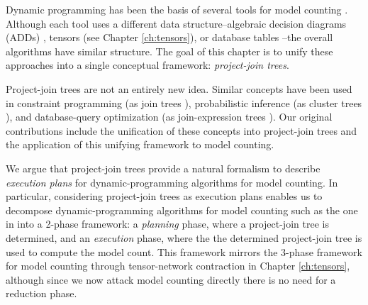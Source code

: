 

Dynamic programming has been the basis of several tools for model counting \cite{DPV20,DDV19,dudek2020parallel,fichte2020exploiting}.
Although each tool uses a different data structure--algebraic decision diagrams (ADDs) \cite{DPV20}, tensors (see Chapter \ref{ch:tensors}), or database tables \cite{fichte2020exploiting}--the overall algorithms have similar structure.
The goal of this chapter is to unify these approaches into a single conceptual framework: \emph{project-join trees}.

Project-join trees are not an entirely new idea.
Similar concepts have been used in constraint programming (as join trees \cite{dechter1989tree}), probabilistic inference (as cluster trees \cite{SAS94}), and database-query optimization (as join-expression trees \cite{MPPV04}).
Our original contributions include the unification of these concepts into project-join trees and the application of this unifying framework to model counting.

We argue that project-join trees provide a natural formalism to describe \emph{execution plans} for dynamic-programming algorithms for model counting.
In particular, considering project-join trees as execution plans enables us to decompose dynamic-programming algorithms for model counting such as the one in  \cite{DPV20,phan2019weighted} into a 2-phase framework: a \emph{planning} phase, where a project-join tree is determined, and an \emph{execution} phase, where the the determined project-join tree is used to compute the model count.
This framework mirrors the 3-phase framework for model counting through tensor-network contraction in Chapter \ref{ch:tensors}, although since we now attack model counting directly there is no need for a reduction phase.


